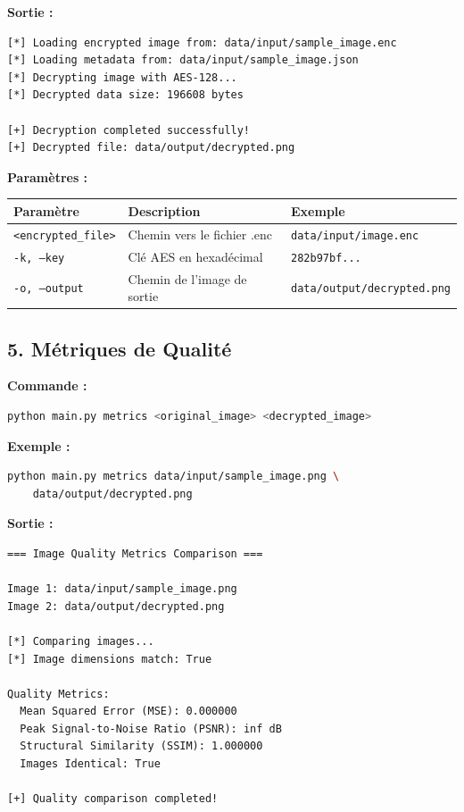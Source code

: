 \documentclass[12pt,a4paper]{report}
\begin{document}
\textbf{Sortie :}
\begin{lstlisting}
[*] Loading encrypted image from: data/input/sample_image.enc
[*] Loading metadata from: data/input/sample_image.json
[*] Decrypting image with AES-128...
[*] Decrypted data size: 196608 bytes

[+] Decryption completed successfully!
[+] Decrypted file: data/output/decrypted.png
\end{lstlisting}

\textbf{Paramètres :}
\begin{table}[H]
    \centering
    \begin{tabular}{|l|l|l|}
    \hline
    \textbf{Paramètre} & \textbf{Description} & \textbf{Exemple} \\
    \hline
    \texttt{<encrypted\_file>} & Chemin vers le fichier .enc & \texttt{data/input/image.enc} \\
    \texttt{-k, --key} & Clé AES en hexadécimal & \texttt{282b97bf...} \\
    \texttt{-o, --output} & Chemin de l'image de sortie & \texttt{data/output/decrypted.png} \\
    \hline
    \end{tabular}
\end{table}

\subsection{5. Métriques de Qualité}

\textbf{Commande :}
\begin{lstlisting}[language=bash]
python main.py metrics <original_image> <decrypted_image>
\end{lstlisting}

\textbf{Exemple :}
\begin{lstlisting}[language=bash]
python main.py metrics data/input/sample_image.png \
    data/output/decrypted.png
\end{lstlisting}

\textbf{Sortie :}
\begin{lstlisting}
=== Image Quality Metrics Comparison ===

Image 1: data/input/sample_image.png
Image 2: data/output/decrypted.png

[*] Comparing images...
[*] Image dimensions match: True

Quality Metrics:
  Mean Squared Error (MSE): 0.000000
  Peak Signal-to-Noise Ratio (PSNR): inf dB
  Structural Similarity (SSIM): 1.000000
  Images Identical: True

[+] Quality comparison completed!
\end{lstlisting}
\end{document}

